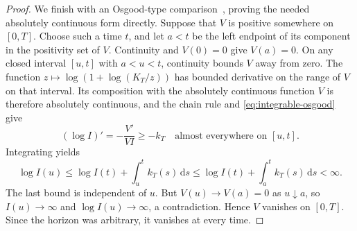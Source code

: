 \begin{proof}
We finish with an Osgood-type comparison~\cite{Osgood1898}, proving
the needed absolutely continuous form directly.  Suppose that $V$ is positive somewhere
on $[0,T]$.  Choose such a time $t$, and let $a<t$ be the left
endpoint of its component in the positivity set of $V$.
Continuity and $V(0)=0$ give $V(a)=0$.  On any closed interval
$[u,t]$ with $a<u<t$, continuity bounds $V$ away from zero.
The function $z\mapsto\log(1+\log(K_T/z))$ has bounded derivative
on the range of $V$ on that interval.  Its composition with the
absolutely continuous function $V$ is therefore absolutely continuous,
and the chain rule and \eqref{eq:integrable-osgood} give
\[
 (\log I)'=-\frac{V'}{VI}\ge-k_T\quad\text{almost everywhere on }[u,t].
\]
Integrating yields
\[
 \log I(u)\le\log I(t)+\int_u^t k_T(s)\,\mathrm ds
             \le\log I(t)+\int_a^t k_T(s)\,\mathrm ds<\infty.
\]
The last bound is independent of $u$.  But $V(u)\to V(a)=0$ as
$u\downarrow a$, so $I(u)\to\infty$ and $\log I(u)\to\infty$,
a contradiction.  Hence $V$ vanishes on $[0,T]$.  Since the horizon
was arbitrary, it vanishes at every time.
\end{proof}
